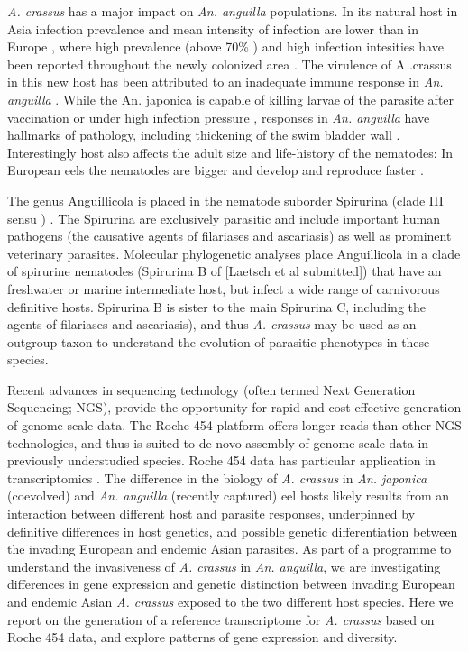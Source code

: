 \documentclass[10pt]{bmc_article}
\newenvironment{bmcformat}{\begin{raggedright}\baselineskip20pt\sloppy\setboolean{publ}{false}}{\end{raggedright}\baselineskip20pt\sloppy}
\begin{document}
\begin{bmcformat}
\textit{A. crassus} has a major impact on \textit{An. anguilla} populations. In its
natural host in Asia infection prevalence and mean intensity of
infection are lower than in Europe \cite{mnderle_occurrence_2006},
where high prevalence (above 70\% \cite{wrtz_distribution_1998}) and
high infection intesities have been reported throughout the newly
colonized area \cite{lefebvre_anguillicolosis:_2004}. The virulence of
A .crassus in this new host has been attributed to an inadequate
immune response in \textit{An. anguilla} \cite{knopf_swimbladder_2006}. While
the An.  japonica is capable of killing larvae of the parasite after
vaccination \cite{knopf_vaccination_2008} or under high infection
pressure \cite{heitlinger_massive_2009}, responses in \textit{An. anguilla}
have hallmarks of pathology, including thickening of the swim bladder
wall \cite{wrtz_histopathological_2000}.  Interestingly host also
affects the adult size and life-history of the nematodes: In European
eels the nematodes are bigger and develop and reproduce faster
\cite{knopf_differences_2004}.

The genus Anguillicola is placed in the nematode suborder Spirurina
(clade III sensu \cite{blaxter_molecular_1998})
\cite{nadler_molecular_2007, wijov_evolutionary_2006}. The Spirurina
are exclusively parasitic and include important human pathogens (the
causative agents of filariases and ascariasis) as well as prominent
veterinary parasites. Molecular phylogenetic analyses place
Anguillicola in a clade of spirurine nematodes (Spirurina B of
[Laetsch et al submitted]) that have an freshwater or marine
intermediate host, but infect a wide range of carnivorous definitive
hosts. Spirurina B is sister to the main Spirurina C, including the
agents of filariases and ascariasis), and thus \textit{A. crassus} may
be used as an outgroup taxon to understand the evolution of parasitic
phenotypes in these species.

Recent advances in sequencing technology (often termed Next Generation
Sequencing; NGS), provide the opportunity for rapid and cost-effective
generation of genome-scale data. The Roche 454 platform
\cite{pmid16056220} offers longer reads than other NGS technologies,
and thus is suited to de novo assembly of genome-scale data in
previously understudied species. Roche 454 data has particular
application in transcriptomics \cite{pmid20950480}. The difference in
the biology of \textit{A. crassus} in \textit{An. japonica}
(coevolved) and \textit{An. anguilla} (recently captured) eel hosts
likely results from an interaction between different host and parasite
responses, underpinned by definitive differences in host genetics, and
possible genetic differentiation between the invading European and
endemic Asian parasites. As part of a programme to understand the
invasiveness of \textit{A. crassus} in \textit{An. anguilla}, we are
investigating differences in gene expression and genetic distinction
between invading European and endemic Asian \textit{A. crassus}
exposed to the two different host species. Here we report on the
generation of a reference transcriptome for \textit{A. crassus} based
on Roche 454 data, and explore patterns of gene expression and
diversity.



\end{bmcformat}
\end{document}
